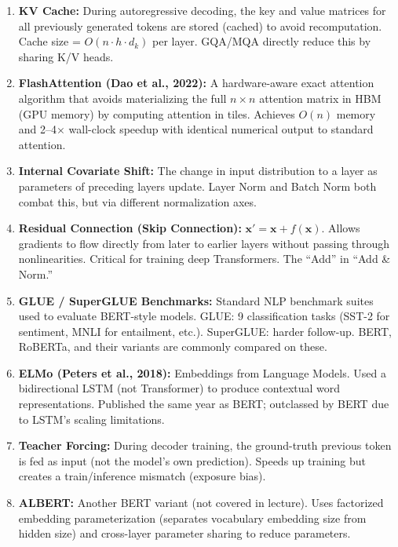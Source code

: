 \documentclass[11pt, a4paper]{article}
\begin{document}
\begin{enumerate}[leftmargin=2em]
  \item \textbf{KV Cache:} During autoregressive decoding, the key and value matrices for all previously generated tokens are stored (cached) to avoid recomputation. Cache size = $O(n \cdot h \cdot d_k)$ per layer. GQA/MQA directly reduce this by sharing K/V heads.

  \item \textbf{FlashAttention (Dao et al., 2022):} A hardware-aware exact attention algorithm that avoids materializing the full $n \times n$ attention matrix in HBM (GPU memory) by computing attention in tiles. Achieves $O(n)$ memory and 2--4$\times$ wall-clock speedup with identical numerical output to standard attention.

  \item \textbf{Internal Covariate Shift:} The change in input distribution to a layer as parameters of preceding layers update. Layer Norm and Batch Norm both combat this, but via different normalization axes.

  \item \textbf{Residual Connection (Skip Connection):} $\mathbf{x}' = \mathbf{x} + f(\mathbf{x})$. Allows gradients to flow directly from later to earlier layers without passing through nonlinearities. Critical for training deep Transformers. The ``Add'' in ``Add \& Norm.''

  \item \textbf{GLUE / SuperGLUE Benchmarks:} Standard NLP benchmark suites used to evaluate BERT-style models. GLUE: 9 classification tasks (SST-2 for sentiment, MNLI for entailment, etc.). SuperGLUE: harder follow-up. BERT, RoBERTa, and their variants are commonly compared on these.

  \item \textbf{ELMo (Peters et al., 2018):} Embeddings from Language Models. Used a bidirectional LSTM (not Transformer) to produce contextual word representations. Published the same year as BERT; outclassed by BERT due to LSTM's scaling limitations.

  \item \textbf{Teacher Forcing:} During decoder training, the ground-truth previous token is fed as input (not the model's own prediction). Speeds up training but creates a train/inference mismatch (exposure bias).

  \item \textbf{ALBERT:} Another BERT variant (not covered in lecture). Uses factorized embedding parameterization (separates vocabulary embedding size from hidden size) and cross-layer parameter sharing to reduce parameters.


\end{enumerate}
\end{document}
